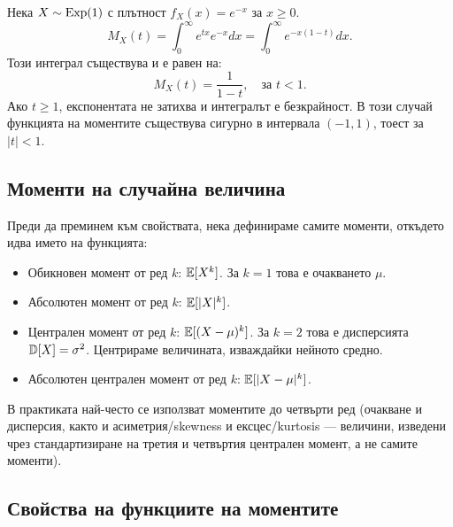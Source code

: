 \begin{example}\label{ex:11-4}
Нека $X \sim \operatorname{Exp}(1)$ с плътност $f_X(x) = e^{-x}$ за $x \ge 0$.
\[ M_X(t) = \int_0^\infty e^{tx} e^{-x} dx = \int_0^\infty e^{-x(1-t)} dx. \]
Този интеграл съществува и е равен на:
\[ M_X(t) = \frac{1}{1-t}, \quad \text{за } t < 1. \]
Ако $t \ge 1$, експонентата не затихва и интегралът е безкрайност. В този случай функцията на моментите съществува сигурно в интервала $(-1, 1)$, тоест за $|t| < 1$.

\end{example}

\subsection{Моменти на случайна величина}
Преди да преминем към свойствата, нека дефинираме самите моменти, откъдето идва името на функцията:
\begin{itemize}
    \item Обикновен момент от ред $k$: $\mathbb{E}[X^k]$. За $k=1$ това е очакването $\mu$.
    \item Абсолютен момент от ред $k$: $\mathbb{E}[|X|^k]$.
    \item Централен момент от ред $k$: $\mathbb{E}[(X - \mu)^k]$. За $k=2$ това е дисперсията $\mathbb{D}[X] = \sigma^2$. Центрираме величината, изваждайки нейното средно.
    \item Абсолютен централен момент от ред $k$: $\mathbb{E}[|X - \mu|^k]$.
\end{itemize}
В практиката най-често се използват моментите до четвърти ред (очакване и дисперсия, както и асиметрия/skewness и ексцес/kurtosis — величини, изведени чрез стандартизиране на третия и четвъртия централен момент, а не самите моменти).

\subsection{Свойства на функциите на моментите}

